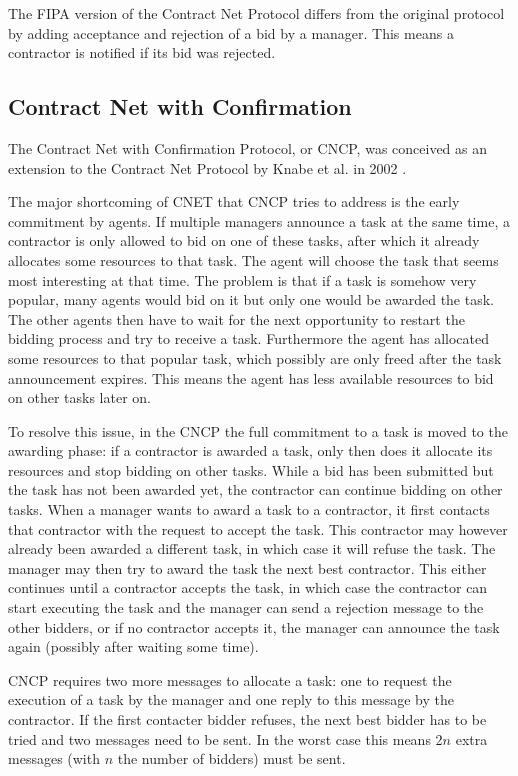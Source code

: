 \documentclass[10pt,a4paper]{article}
\begin{document}
The FIPA version of the Contract Net Protocol \cite{CNETStandard} differs from the original protocol by adding acceptance and rejection of a bid by a manager. This means a contractor is notified if its bid was rejected.

\subsection{Contract Net with Confirmation} 
The Contract Net with Confirmation Protocol, or CNCP, was conceived as an extension to the Contract Net Protocol by Knabe et al. in 2002 \cite{CNCP}.

The major shortcoming of CNET that CNCP tries to address is the early commitment by agents. If multiple managers announce a task at the same time, a contractor is only allowed to bid on one of these tasks, after which it already allocates some resources to that task. The agent will choose the task that seems most interesting at that time. The problem is that if a task is somehow very popular, many agents would bid on it but only one would be awarded the task. The other agents then have to wait for the next opportunity to restart the bidding process and try to receive a task. Furthermore the agent has allocated some resources to that popular task, which possibly are only freed after the task announcement expires. This means the agent has less available resources to bid on other tasks later on.

To resolve this issue, in the CNCP the full commitment to a task is moved to the awarding phase: if a contractor is awarded a task, only then does it allocate its resources and stop bidding on other tasks. While a bid has been submitted but the task has not been awarded yet, the contractor can continue bidding on other tasks. When a manager wants to award a task to a contractor, it first contacts that contractor with the request to accept the task. This contractor may however already been awarded a different task, in which case it will refuse the task. The manager may then try to award the task the next best contractor. This either continues until a contractor accepts the task, in which case the contractor can start executing the task and the manager can send a rejection message to the other bidders, or if no contractor accepts it, the manager can announce the task again (possibly after waiting some time).

CNCP requires two more messages to allocate a task: one to request the execution of a task by the manager and one reply to this message by the contractor. If the first contacter bidder refuses, the next best bidder has to be tried and two messages need to be sent. In the worst case this means 2$n$ extra messages (with $n$ the number of bidders) must be sent.
\end{document}
